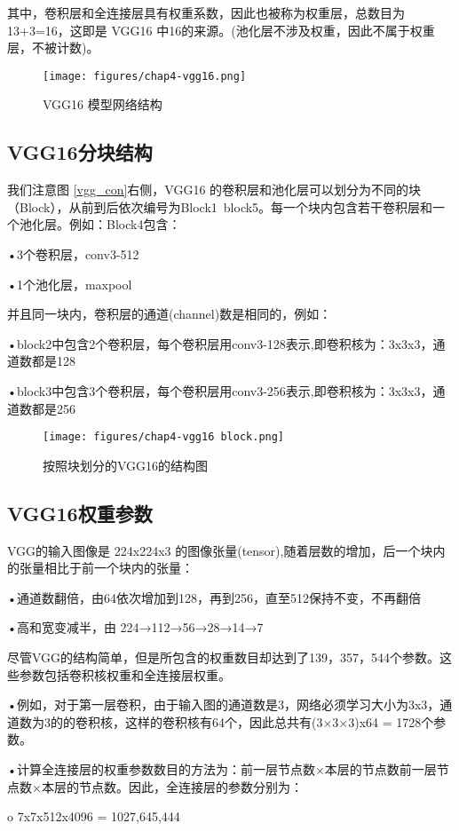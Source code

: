 其中，卷积层和全连接层具有权重系数，因此也被称为权重层，总数目为13+3=16，这即是
VGG16 中16的来源。(池化层不涉及权重，因此不属于权重层，不被计数)。

\begin{figure}[H]
	\centering
	\texttt{[image: figures/chap4-vgg16.png]}
	\caption{VGG16 模型网络结构}
\end{figure}
 
\subsection{VGG16分块结构}
我们注意图 \ref{vgg_con}右侧，VGG16 的卷积层和池化层可以划分为不同的块（Block），从前到后依次编号为Block1~block5。每一个块内包含若干卷积层和一个池化层。例如：Block4包含：

•3个卷积层，conv3-512

•1个池化层，maxpool

并且同一块内，卷积层的通道(channel)数是相同的，例如：

•block2中包含2个卷积层，每个卷积层用conv3-128表示,即卷积核为：3x3x3，通道数都是128

•block3中包含3个卷积层，每个卷积层用conv3-256表示,即卷积核为：3x3x3，通道数都是256

\begin{figure}[htbp]
	\centering
	\texttt{[image: figures/chap4-vgg16 block.png]}
	\caption{按照块划分的VGG16的结构图}
\end{figure} 

\subsection{VGG16权重参数}
VGG的输入图像是 224x224x3 的图像张量(tensor),随着层数的增加，后一个块内的张量相比于前一个块内的张量：

•通道数翻倍，由64依次增加到128，再到256，直至512保持不变，不再翻倍

•高和宽变减半，由 224→112→56→28→14→7

尽管VGG的结构简单，但是所包含的权重数目却达到了139，357，544个参数。这些参数包括卷积核权重和全连接层权重。

•例如，对于第一层卷积，由于输入图的通道数是3，网络必须学习大小为3x3，通道数为3的的卷积核，这样的卷积核有64个，因此总共有(3×3×3)x64 = 1728个参数。

•计算全连接层的权重参数数目的方法为：前一层节点数×本层的节点数前一层节点数×本层的节点数。因此，全连接层的参数分别为：

o	7x7x512x4096 = 1027,645,444

